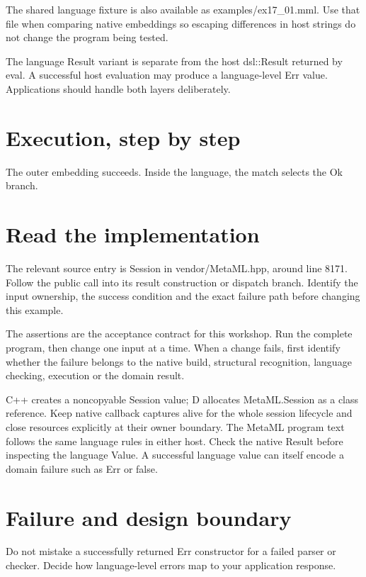 The shared language fixture is also available as examples/ex17\_01.mml. Use that file when comparing native embeddings so escaping differences in host strings do not change the program being tested.

\clearpage
{}
The language Result variant is separate from the host dsl::Result returned by eval. A successful host evaluation may produce a language-level Err value. Applications should handle both layers deliberately.


\section*{Execution, step by step}
The outer embedding succeeds. Inside the language, the match selects the Ok branch.

\section*{Read the implementation}
The relevant source entry is Session in vendor/MetaML.hpp, around line 8171. Follow the public call into its result construction or dispatch branch. Identify the input ownership, the success condition and the exact failure path before changing this example.

The assertions are the acceptance contract for this workshop. Run the complete program, then change one input at a time. When a change fails, first identify whether the failure belongs to the native build, structural recognition, language checking, execution or the domain result.

\clearpage
{}
C++ creates a noncopyable Session value; D allocates MetaML.Session as a class reference. Keep native callback captures alive for the whole session lifecycle and close resources explicitly at their owner boundary. The MetaML program text follows the same language rules in either host. Check the native Result before inspecting the language Value. A successful language value can itself encode a domain failure such as Err or false.


\section*{Failure and design boundary}
Do not mistake a successfully returned Err constructor for a failed parser or checker. Decide how language-level errors map to your application response.

